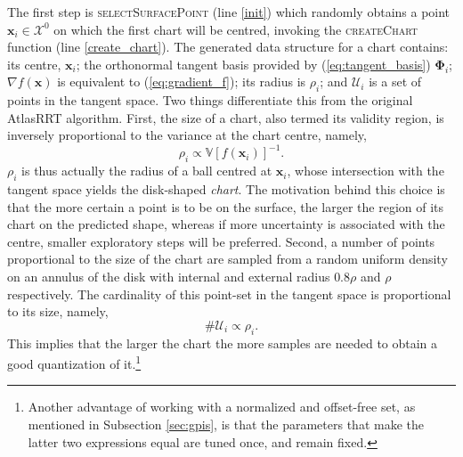 The first step is \textsc{selectSurfacePoint} (line \ref{init}) which randomly obtains a point $\mathbf{x}_i \in \mathcal{X}^0$ on which the first chart will be centred, invoking the \textsc{createChart} function (line \ref{create_chart}). The generated data structure for a chart contains: its centre, $\mathbf{x}_i$; the orthonormal tangent basis provided by (\ref{eq:tangent_basis}) $\boldsymbol{\Phi}_i$; $\nabla f(\mathbf{x})$ is equivalent to (\ref{eq:gradient_f}); its radius is $\rho_i$; and $\mathcal{U}_i$ is a set of points in the tangent space. Two things differentiate this from the original AtlasRRT algorithm. First, the size of a chart, also termed its validity region, is inversely proportional to the variance at the chart centre, namely,
\begin{equation}
\rho_i \propto \mathbb{V}[f(\mathbf{x}_i)]^{-1}.
\end{equation}
$\rho_i$ is thus actually the radius of a ball centred at $\mathbf{x}_i$, whose intersection with the tangent space yields the disk-shaped \emph{chart}. The motivation behind this choice is that the more certain a point is to be on the surface, the larger the region of its chart on the predicted shape, whereas if more uncertainty is associated with the centre, smaller exploratory steps will be preferred. Second, a number of points proportional to the size of the chart are sampled from a random uniform density on an annulus of the disk with internal and external radius $0.8\rho$ and $\rho$ respectively. The cardinality of this point-set in the tangent space is proportional to its size, namely,
\begin{equation}
\#\mathcal{U}_i \propto \rho_i.
\end{equation}
This implies that the larger the chart the more samples are needed to obtain a good quantization of it.\footnote{Another advantage of working with a normalized and offset-free set, as mentioned in Subsection \ref{sec:gpis}, is that the parameters that make the latter two expressions equal are tuned once, and remain fixed.}

